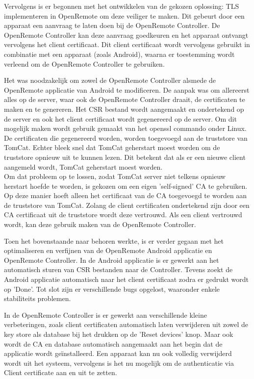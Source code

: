 \documentclass[]{article}
\begin{document}
Vervolgens is er begonnen met het ontwikkelen van de gekozen oplossing:
TLS implementeren in OpenRemote om deze veiliger te maken. Dit gebeurt
door een apparaat een aanvraag te laten doen bij de OpenRemote Controller. De
OpenRemote Controller kan deze aanvraag goedkeuren en het apparaat ontvangt
vervolgens het client certificaat. Dit client certificaat wordt vervolgens
gebruikt in combinatie met een apparaat (zoals Android), waarna er toestemming
wordt verleend om de OpenRemote Controller te gebruiken.

Het was noodzakelijk om zowel de OpenRemote Controller alsmede de OpenRemote
applicatie van Android te modificeren. De aanpak was om allereerst alles op de
server, waar ook de OpenRemote Controller draait, de certificaten te maken en te
genereren. Het CSR bestand wordt aangemaakt en ondertekend op de server en ook
het client certificaat wordt gegenereerd op de server. Om dit mogelijk maken
wordt gebruik gemaakt van het openssl commando onder Linux.  De certificaten die
gegenereerd worden, worden toegevoegd aan de truststore van TomCat. Echter bleek
snel dat TomCat geherstart moest worden om de truststore opnieuw uit te 
kunnen lezen. Dit betekent dat als er een nieuwe client aangemeld wordt, TomCat
geherstart moest worden.
\\ Om dat probleem op te lossen, zodat TomCat server niet
telkens opnieuw herstart hoefde te worden, is gekozen om een eigen
'self-signed' CA te gebruiken. Op deze manier hoeft alleen het certificaat van
de CA toegevoegd te worden aan de truststore van TomCat.  Zolang de client
certificaten ondertekend zijn door een CA certificaat uit de
truststore wordt deze vertrouwd. Als een client vertrouwd wordt, kan deze
gebruik maken van de OpenRemote Controller.

Toen het bovenstaande naar behoren werkte, is er verder gegaan met het
optimaliseren en verfijnen van de OpenRemote Android applicatie en OpenRemote
Controller. In de Android applicatie is er gewerkt aan het automatisch sturen
van CSR bestanden naar de Controller. Tevens zoekt de Android applicatie
automatisch naar het client certificaat zodra er gedrukt wordt op 'Done'. Tot
slot zijn er verschillende bugs opgelost, waaronder enkele stabiliteits
problemen.

In de OpenRemote Controller is er gewerkt aan verschillende kleine
verbeteringen, zoals client certificaten automatisch laten verwijderen uit zowel
de key store als database bij het drukken op de 'Reset devices' knop. Maar ook
wordt de CA en database automatisch aangemaakt aan het begin dat de applicatie
wordt ge\"installeerd.  Een apparaat kan nu ook volledig verwijderd wordt uit het
systeem, vervolgens is het nu mogelijk om de authenticatie via Client
certificate aan en uit te zetten. 
\end{document}
